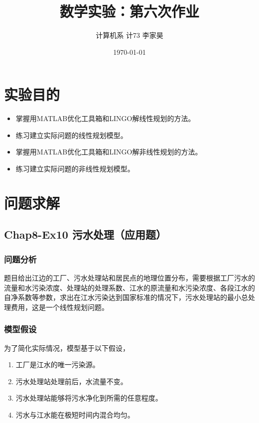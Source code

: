 \documentclass[12pt,a4paper]{article}
\title{数学实验：第六次作业}
\author{计算机系 \quad 计73 \quad 2017011620 \quad 李家昊}
\date{\today}
\begin{document}
\maketitle

\section{实验目的}

\begin{itemize}
    \item 掌握用MATLAB优化工具箱和LINGO解线性规划的方法。
    \item 练习建立实际问题的线性规划模型。
    \item 掌握用MATLAB优化工具箱和LINGO解非线性规划的方法。
    \item 练习建立实际问题的非线性规划模型。
\end{itemize}

\section{问题求解}

\subsection{Chap8-Ex10 污水处理（应用题）}

\subsubsection{问题分析}

题目给出江边的工厂、污水处理站和居民点的地理位置分布，需要根据工厂污水的流量和水污染浓度、处理站的处理系数、江水的原流量和水污染浓度、各段江水的自净系数等参数，求出在江水污染达到国家标准的情况下，污水处理站的最小总处理费用，这是一个线性规划问题。

\subsubsection{模型假设}

为了简化实际情况，模型基于以下假设，
\begin{enumerate}
    \item 工厂是江水的唯一污染源。
    \item 污水处理站处理前后，水流量不变。
    \item 污水处理站能够将污水净化到所需的任意程度。
    \item 污水与江水能在极短时间内混合均匀。
\end{enumerate}
\end{document}
